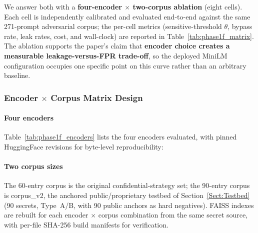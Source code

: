 \documentclass[journal]{IEEEtran}
\begin{document}
We answer both with a \textbf{four-encoder $\times$ two-corpus ablation} (eight cells). Each cell is independently calibrated and evaluated end-to-end against the same 271-prompt adversarial corpus; the per-cell metrics (sensitive-threshold $\theta$, bypass rate, leak rates, cost, and wall-clock) are reported in Table~\ref{tab:phase1f_matrix}. The ablation supports the paper's claim that \textbf{encoder choice creates a measurable leakage-versus-FPR trade-off}, so the deployed MiniLM configuration occupies one specific point on this curve rather than an arbitrary baseline.

\subsubsection{Encoder $\times$ Corpus Matrix Design}
\label{Sect:V_A_2_Matrix_Design}

\paragraph{Four encoders}
Table~\ref{tab:phase1f_encoders} lists the four encoders evaluated, with pinned HuggingFace revisions for byte-level reproducibility:

\begin{table}[!t]
    \centering
    \caption{Encoders evaluated in the encoder ablation.}
    \label{tab:phase1f_encoders}
\end{table}

\paragraph{Two corpus sizes}
The 60-entry corpus is the original confidential-strategy set; the 90-entry corpus is corpus\_v2, the anchored public/proprietary testbed of Section~\ref{Sect:Testbed} (90 secrets, Type~A/B, with 90 public anchors as hard negatives). FAISS indexes are rebuilt for each encoder $\times$ corpus combination from the same secret source, with per-file SHA-256 build manifests for verification.
\end{document}
